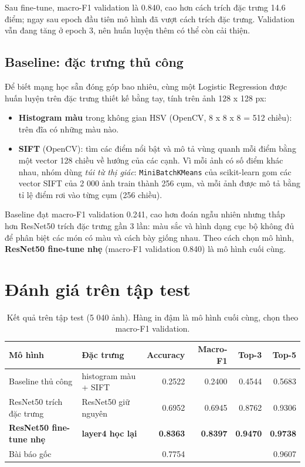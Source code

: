 Sau fine-tune, macro-F1 validation là 0.840, cao hơn cách trích đặc trưng 14.6 điểm; ngay sau epoch đầu tiên mô hình đã
vượt cách trích đặc trưng. Validation vẫn đang tăng ở epoch 3, nên huấn luyện thêm có thể còn cải thiện.

\subsection{Baseline: đặc trưng thủ công}

Để biết mạng học sẵn đóng góp bao nhiêu, cùng một Logistic Regression được huấn luyện trên đặc trưng thiết kế bằng tay,
tính trên ảnh 128 x 128 px:

\begin{itemize}
  \item \textbf{Histogram màu} trong không gian HSV (OpenCV, 8 x 8 x 8 = 512 chiều): trên đĩa có những màu nào.
  \item \textbf{SIFT} (OpenCV): tìm các điểm nổi bật và mô tả vùng quanh mỗi điểm bằng một vector 128 chiều về hướng của
        các cạnh. Vì mỗi ảnh có số điểm khác nhau, nhóm dùng \textit{túi từ thị giác}: \texttt{MiniBatchKMeans} của
        scikit-learn gom các vector SIFT của 2 000 ảnh train thành 256 cụm, và mỗi ảnh được mô tả bằng tỉ lệ điểm rơi vào
        từng cụm (256 chiều).
\end{itemize}

Baseline đạt macro-F1 validation 0.241, cao hơn đoán ngẫu nhiên nhưng thấp hơn ResNet50 trích đặc trưng gần 3 lần: màu
sắc và hình dạng cục bộ không đủ để phân biệt các món có màu và cách bày giống nhau. Theo cách chọn mô hình,
\textbf{ResNet50 fine-tune nhẹ} (macro-F1 validation 0.840) là mô hình cuối cùng.

\section{Đánh giá trên tập test}

\begin{table}[H]\centering
\caption{Kết quả trên tập test (5 040 ảnh). Hàng in đậm là mô hình cuối cùng, chọn theo macro-F1 validation.}\label{tab:img-test}
\small
\begin{tabular}{llrrrr}
\toprule
Mô hình & Đặc trưng & Accuracy & Macro-F1 & Top-3 & Top-5 \\
\midrule
Baseline thủ công & histogram màu + SIFT & 0.2522 & 0.2400 & 0.4544 & 0.5683 \\
ResNet50 trích đặc trưng & ResNet50 giữ nguyên & 0.6952 & 0.6945 & 0.8762 & 0.9306 \\
\textbf{ResNet50 fine-tune nhẹ} & \textbf{layer4 học lại} & \textbf{0.8363} & \textbf{0.8397} & \textbf{0.9470} & \textbf{0.9738} \\
\midrule
Bài báo gốc & & 0.7754 & & & 0.9607 \\
\bottomrule
\end{tabular}
\end{table}

